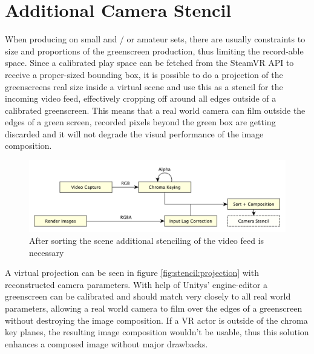 %
\section{Additional Camera Stencil}

When producing on small and / or amateur sets, there are usually constraints to 
size and proportions of the greenscreen production, thus limiting the 
record-able space. Since a calibrated play space can be fetched from the 
SteamVR API to receive a proper-sized bounding box, it is possible to do a 
projection of the greenscreens real size inside a virtual scene and use this as 
a stencil for the incoming video feed, effectively cropping off around all 
edges outside of a calibrated greenscreen. This means that a real world camera 
can film outside the edges of a green screen, recorded pixels beyond the green 
box are getting discarded and it will not degrade the visual performance of the 
image composition.

\begin{figure}[htb]
	\includegraphics[width=\textwidth]{_raw_resources/pipeline_steps/4_6_stencil.pdf}
	\caption{After sorting the scene additional stenciling of the video feed is 
	necessary}
	\label{fig:steps:stencil}
\end{figure}

A virtual projection can be seen in figure \ref{fig:stencil:projection} with 
reconstructed camera parameters. With help of Unitys' engine-editor a 
greenscreen can be calibrated and should match very closely to all real world 
parameters, allowing a real world camera to film over the edges of a 
greenscreen without destroying the image composition. If a VR actor is outside 
of the chroma key planes, the resulting image composition wouldn't be usable, 
thus this solution enhances a composed image without major drawbacks.

